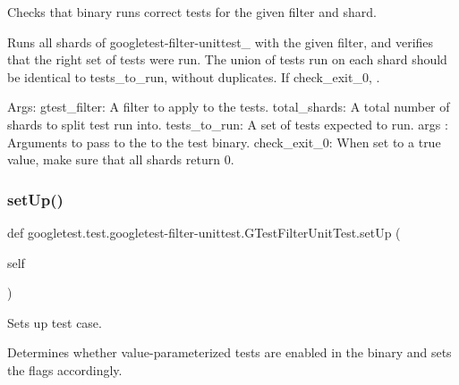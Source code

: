 \begin{DoxyVerb}Checks that binary runs correct tests for the given filter and shard.

Runs all shards of googletest-filter-unittest_ with the given filter, and
verifies that the right set of tests were run. The union of tests run
on each shard should be identical to tests_to_run, without duplicates.
If check_exit_0, .

Args:
  gtest_filter: A filter to apply to the tests.
  total_shards: A total number of shards to split test run into.
  tests_to_run: A set of tests expected to run.
  args   :      Arguments to pass to the to the test binary.
  check_exit_0: When set to a true value, make sure that all shards
            return 0.
\end{DoxyVerb}
 \mbox{\label{classgoogletest_1_1test_1_1googletest-filter-unittest_1_1_g_test_filter_unit_test_a8c0de5b9e682a3d985190bf6ccbb7bca}} 
\subsubsection{\texorpdfstring{setUp()}{setUp()}}
{\footnotesize\ttfamily def googletest.\+test.\+googletest-\/filter-\/unittest.\+G\+Test\+Filter\+Unit\+Test.\+set\+Up (\begin{DoxyParamCaption}\item[{}]{self }\end{DoxyParamCaption})}

\begin{DoxyVerb}Sets up test case.

Determines whether value-parameterized tests are enabled in the binary and
sets the flags accordingly.
\end{DoxyVerb}
 \mbox{\label{classgoogletest_1_1test_1_1googletest-filter-unittest_1_1_g_test_filter_unit_test_a6344624d3c5bbed535b46840d684665a}} 

